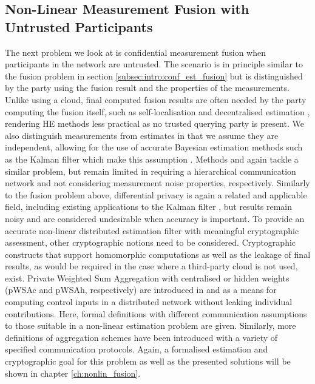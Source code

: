 \subsection{Non-Linear Measurement Fusion with Untrusted Participants}\label{subsec:intro:conf_nonlin_measurements}
The next problem we look at is confidential measurement fusion when participants in the network are untrusted. The scenario is in principle similar to the fusion problem in section \ref{subsec:intro:conf_est_fusion} but is distinguished by the party using the fusion result and the properties of the measurements. Unlike using a cloud, final computed fusion results are often needed by the party computing the fusion itself, such as self-localisation and decentralised estimation \cite{sridharCooperativePerceptionAutonomous2019,grimeDataFusionDecentralized1994,pintoSelflocalisationIndoorMobile2013}, rendering HE methods less practical as no trusted querying party is present. We also distinguish measurements from estimates in that we assume they are independent, allowing for the use of accurate Bayesian estimation methods such as the Kalman filter which make this assumption \cite{haugBayesianEstimationTracking2012}. Methods \cite{aristovEncryptedMultisensorInformation2018} and \cite{alanwarPrOLocResilientLocalization2017} again tackle a similar problem, but remain limited in requiring a hierarchical communication network and not considering measurement noise properties, respectively. Similarly to the fusion problem above, differential privacy \cite{dworkDifferentialPrivacySurvey2008} is again a related and applicable field, including existing applications to the Kalman filter \cite{nyDifferentiallyPrivateKalman2012}, but results remain noisy and are considered undesirable when accuracy is important. To provide an accurate non-linear distributed estimation filter with meaningful cryptographic assessment, other cryptographic notions need to be considered. Cryptographic constructs that support homomorphic computations as well as the leakage of final results, as would be required in the case where a third-party cloud is not used, exist. Private Weighted Sum Aggregation with centralised or hidden weights (pWSAc and pWSAh, respectively) are introduced in \cite{schulzedarupEncryptedCooperativeControl2019} and \cite{alexandruPrivateWeightedSum2020} as a means for computing control inputs in a distributed network without leaking individual contributions. Here, formal definitions with different communication assumptions to those suitable in a non-linear estimation problem are given. Similarly, more definitions of aggregation schemes have been introduced \cite{shiPrivacyPreservingAggregationTimeSeries2011,joyeScalableSchemePrivacyPreserving2013,benhamoudaNewFrameworkPrivacyPreserving2016,darcoProbabilisticSecretSharing2018,beckerRevisitingPrivateStream2018,chanPrivacyPreservingStreamAggregation2012} with a variety of specified communication protocols. Again, a formalised estimation and cryptographic goal for this problem as well as the presented solutions will be shown in chapter \ref{ch:nonlin_fusion}.

